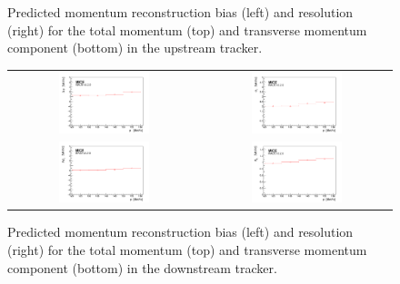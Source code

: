 \begin{figure}
\begin{center}
\begin{tabular}{cc}
    \end{tabular}
  \end{center}
  \caption{
    Predicted momentum reconstruction bias (left) and resolution
    (right) for the total momentum (top) and transverse momentum
    component (bottom) in the upstream tracker.
  }
  \label{trackers:performance:resolutions:up}
\end{figure}
\begin{figure}
  \begin{center}
    \begin{tabular}{cc}
      \includegraphics[width=0.5\textwidth]{downstream_p_bias_p_logo.pdf} &	
      \includegraphics[width=0.5\textwidth]{downstream_p_resolution_p_logo.pdf} \\
      \includegraphics[width=0.5\textwidth]{downstream_pt_bias_p_logo.pdf} &
      \includegraphics[width=0.5\textwidth]{downstream_pt_resolution_p_logo.pdf}
    \end{tabular}
  \end{center}
  \caption{Predicted momentum reconstruction bias (left) and
    resolution (right) for the total momentum (top) and transverse
    momentum component (bottom) in the downstream tracker.
  }
  \label{trackers:performance:resolutions:down}
\end{figure}

